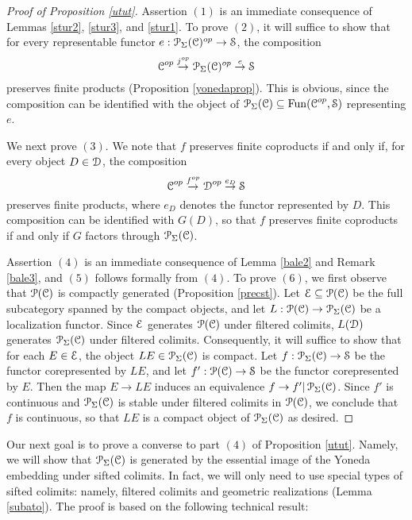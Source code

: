 \begin{proof}[Proof of Proposition \ref{utut}]
Assertion $(1)$ is an immediate consequence of Lemmas \ref{stur2}, \ref{stur3}, and \ref{stur1}. To prove $(2)$, it will suffice to show that for every representable functor
$e: \operatorname{\mathcal{P}}_{\Sigma}(\operatorname{\mathcal{C}})^{op} \rightarrow \operatorname{\mathcal{S}}$, the composition
$$ \operatorname{\mathcal{C}}^{op} \stackrel{j^{op}}{\rightarrow} \operatorname{\mathcal{P}}_{\Sigma}(\operatorname{\mathcal{C}})^{op} \stackrel{e}{\rightarrow} \operatorname{\mathcal{S}}$$
preserves finite products (Proposition \ref{yonedaprop}). This is obvious, since the composition can be identified with the object of $\operatorname{\mathcal{P}}_{\Sigma}(\operatorname{\mathcal{C}}) \subseteq
\operatorname{Fun}( \operatorname{\mathcal{C}}^{op}, \operatorname{\mathcal{S}})$ representing $e$.

We next prove $(3)$. We note that $f$ preserves finite coproducts if and only if, for
every object $D \in \operatorname{\mathcal{D}}$, the composition
$$ \operatorname{\mathcal{C}}^{op} \stackrel{f^{op}}{\rightarrow} \operatorname{\mathcal{D}}^{op} \stackrel{e_D}{\rightarrow} \operatorname{\mathcal{S}}$$
preserves finite products, where $e_D$ denotes the functor represented by $D$. 
This composition can be identified with $G(D)$, so that $f$ preserves finite coproducts if and only if
$G$ factors through $\operatorname{\mathcal{P}}_{\Sigma}(\operatorname{\mathcal{C}})$.

Assertion $(4)$ is an immediate consequence of Lemma \ref{bale2} and Remark \ref{bale3}, and $(5)$ follows formally from $(4)$. To prove $(6)$, we first observe that
$\operatorname{\mathcal{P}}(\operatorname{\mathcal{C}})$ is compactly generated (Proposition \ref{precst}). Let $\operatorname{\mathcal{E}}
\subseteq \operatorname{\mathcal{P}}(\operatorname{\mathcal{C}})$ be the full subcategory spanned by the compact objects, and let
$L: \operatorname{\mathcal{P}}(\operatorname{\mathcal{C}}) \rightarrow \operatorname{\mathcal{P}}_{\Sigma}(\operatorname{\mathcal{C}})$ be a localization functor. Since
$\operatorname{\mathcal{E}}$ generates $\operatorname{\mathcal{P}}(\operatorname{\mathcal{C}})$ under filtered colimits, $L(\operatorname{\mathcal{D}})$ generates
$\operatorname{\mathcal{P}}_{\Sigma}(\operatorname{\mathcal{C}})$ under filtered colimits. Consequently, it will suffice to
show that for each $E \in \operatorname{\mathcal{E}}$, the object $LE \in \operatorname{\mathcal{P}}_{\Sigma}(\operatorname{\mathcal{C}})$ is compact. Let
$f: \operatorname{\mathcal{P}}_{\Sigma}(\operatorname{\mathcal{C}}) \rightarrow \operatorname{\mathcal{S}}$ be the functor corepresented by $LE$, and let
$f': \operatorname{\mathcal{P}}(\operatorname{\mathcal{C}}) \rightarrow \operatorname{\mathcal{S}}$ be the functor corepresented by $E$. Then
the map $E \rightarrow LE$ induces an equivalence
$f \rightarrow f' | \operatorname{\mathcal{P}}_{\Sigma}(\operatorname{\mathcal{C}})$. Since $f'$ is continuous and
$\operatorname{\mathcal{P}}_{\Sigma}(\operatorname{\mathcal{C}})$ is stable under filtered colimits in $\operatorname{\mathcal{P}}(\operatorname{\mathcal{C}})$, we conclude
that $f$ is continuous, so that $LE$ is a compact object of $\operatorname{\mathcal{P}}_{\Sigma}(\operatorname{\mathcal{C}})$ as desired.
\end{proof}

Our next goal is to prove a converse to part $(4)$ of Proposition \ref{utut}. Namely, we will show that $\operatorname{\mathcal{P}}_{\Sigma}(\operatorname{\mathcal{C}})$ is generated by the essential image of the Yoneda embedding
under sifted colimits. In fact, we will only need to use special types of sifted colimits: namely, filtered colimits and geometric realizations (Lemma \ref{subato}). The proof is based on the following technical result:

